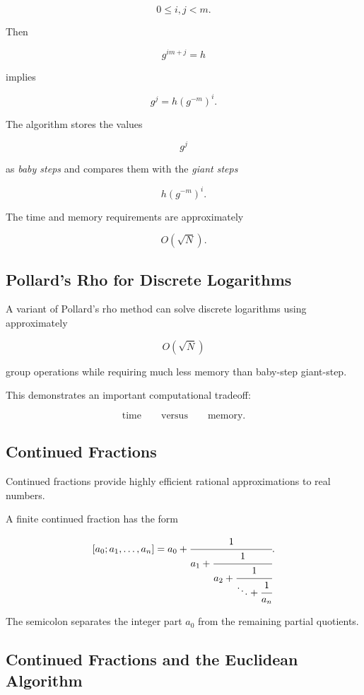\[ 0\leq i,j<m. \]

Then

\[ g^{im+j}=h \]

implies

\[ g^j=h(g^{-m})^i. \]

The algorithm stores the values

\[ g^j \]

as \emph{baby steps} and compares them with the \emph{giant steps}

\[ h(g^{-m})^i. \]

The time and memory requirements are approximately

\[ O(\sqrt N). \]

\subsection{Pollard's Rho for Discrete Logarithms}
\label{subsec:pollard-rho-discrete-log}

A variant of Pollard's rho method can solve discrete logarithms using
approximately

\[ O(\sqrt N) \]

group operations while requiring much less memory than baby-step
giant-step.

This demonstrates an important computational tradeoff:

\[
\boxed{
\text{time}
\qquad\text{versus}\qquad
\text{memory}.
}
\]

\subsection{Continued Fractions}
\label{subsec:computational-continued-fractions}

Continued fractions provide highly efficient rational approximations to real
numbers.

A finite continued fraction has the form

\[
[a_0;a_1,\ldots,a_n]
=
a_0+
\cfrac{1}{
a_1+\cfrac{1}{
a_2+\cfrac{1}{
\ddots+\cfrac1{a_n}}}}.
\]

The semicolon separates the integer part \(a_0\) from the remaining partial
quotients.

\subsection{Continued Fractions and the Euclidean Algorithm}
\label{subsec:continued-fractions-euclid}

